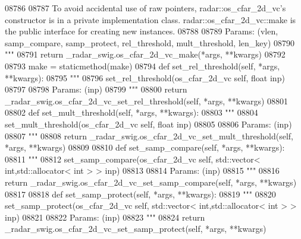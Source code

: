 \begin{DoxyCode}
{{{{{{{{{{{{{{{{{{{{{{{{{{{{{08786 \textcolor{stringliteral}{}
08787 \textcolor{stringliteral}{        To avoid accidental use of raw pointers, radar::os\_cfar\_2d\_vc's constructor is in a private
       implementation class. radar::os\_cfar\_2d\_vc::make is the public interface for creating new instances.}
08788 \textcolor{stringliteral}{}
08789 \textcolor{stringliteral}{        Params: (vlen, samp\_compare, samp\_protect, rel\_threshold, mult\_threshold, len\_key)}
08790 \textcolor{stringliteral}{        """}
08791         \textcolor{keywordflow}{return} \_radar\_swig.os\_cfar\_2d\_vc\_make(*args, **kwargs)
08792 
08793     make = staticmethod(make)
08794     \textcolor{keyword}{def }set_rel_threshold(self, *args, **kwargs):
08795         \textcolor{stringliteral}{"""}
08796 \textcolor{stringliteral}{        set\_rel\_threshold(os\_cfar\_2d\_vc self, float inp)}
08797 \textcolor{stringliteral}{}
08798 \textcolor{stringliteral}{        Params: (inp)}
08799 \textcolor{stringliteral}{        """}
08800         \textcolor{keywordflow}{return} \_radar\_swig.os\_cfar\_2d\_vc\_set\_rel\_threshold(self, *args, **kwargs)
08801 
08802     \textcolor{keyword}{def }set_mult_threshold(self, *args, **kwargs):
08803         \textcolor{stringliteral}{"""}
08804 \textcolor{stringliteral}{        set\_mult\_threshold(os\_cfar\_2d\_vc self, float inp)}
08805 \textcolor{stringliteral}{}
08806 \textcolor{stringliteral}{        Params: (inp)}
08807 \textcolor{stringliteral}{        """}
08808         \textcolor{keywordflow}{return} \_radar\_swig.os\_cfar\_2d\_vc\_set\_mult\_threshold(self, *args, **kwargs)
08809 
08810     \textcolor{keyword}{def }set_samp_compare(self, *args, **kwargs):
08811         \textcolor{stringliteral}{"""}
08812 \textcolor{stringliteral}{        set\_samp\_compare(os\_cfar\_2d\_vc self, std::vector< int,std::allocator< int > > inp)}
08813 \textcolor{stringliteral}{}
08814 \textcolor{stringliteral}{        Params: (inp)}
08815 \textcolor{stringliteral}{        """}
08816         \textcolor{keywordflow}{return} \_radar\_swig.os\_cfar\_2d\_vc\_set\_samp\_compare(self, *args, **kwargs)
08817 
08818     \textcolor{keyword}{def }set_samp_protect(self, *args, **kwargs):
08819         \textcolor{stringliteral}{"""}
08820 \textcolor{stringliteral}{        set\_samp\_protect(os\_cfar\_2d\_vc self, std::vector< int,std::allocator< int > > inp)}
08821 \textcolor{stringliteral}{}
08822 \textcolor{stringliteral}{        Params: (inp)}
08823 \textcolor{stringliteral}{        """}
08824         \textcolor{keywordflow}{return} \_radar\_swig.os\_cfar\_2d\_vc\_set\_samp\_protect(self, *args, **kwargs)
}}}}}}}}}}}}}}}}}}}}}}}}}}}}}
\end{DoxyCode}
